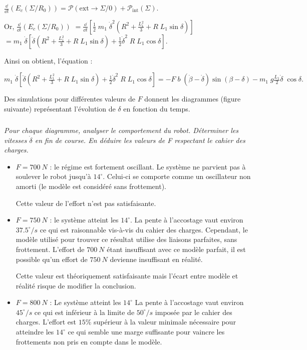 \begin{multicols}{2}
\begin{corrige}
$
\frac{\dd }{\dd t}(E_c(\Sigma/R_0))=\mathcal{P}(\text{ext}\rightarrow \Sigma/0)+\mathcal{P}_\text{int}( \Sigma).
$

Or, $
\frac{\dd }{\dd t}(E_c(\Sigma/R_0))$ 
$=\frac{\dd }{\dd t}\left[\frac{1}{2}\;m_1\;\dot{\delta}^2\left(R^2+\frac{L_1^2}{3}+R\;L_1\sin\delta\right)\right]$
$=m_1\;\dot{\delta}\left[\ddot{\delta}\left(R^2+\frac{L_1^2}{3}+R\;L_1\sin\delta\right)+\frac{1}{2}\dot{\delta}^2\;R\;L_1\cos\delta\right]$.


Ainsi on obtient, l'équation :


$
\boxed{
m_1\;\dot{\delta}\left[\ddot{\delta}\left(R^2+\frac{L_1^2}{3}+R\;L_1\sin\delta\right)+\frac{1}{2}\dot{\delta}^2\;R\;L_1\cos\delta\right]
=-F\;b\;\left(\dot{\beta}-\dot{\delta}\right)\sin(\beta-\delta)-m_1\;g\frac{L_1}{2}\dot{\delta}\;\cos\delta.
}
$

\end{corrige}
\else
\fi


Des simulations pour différentes valeurs de $F$ donnent les diagrammes (figure suivante) représentant l'évolution de $\delta$ en fonction du temps.

\subparagraph{}
\textit{Pour chaque diagramme, analyser le comportement du robot. Déterminer les vitesses $\dot{\delta}$ en fin de course. En déduire les valeurs de F respectant le cahier des charges.}
\ifprof
\begin{corrige}
\begin{itemize}
\item \textbf{$F=\SI{700}{N}$} : le régime est fortement oscillant. Le système ne parvient pas à soulever
le robot jusqu'à $14^{\circ}$. Celui-ci se comporte comme un oscillateur non
amorti (le modèle est considéré sans frottement).

Cette valeur de l'effort n'est pas satisfaisante.

\item \textbf{$F=\SI{750}{N}$} : le système atteint les $14^{\circ}$. La pente à l'accostage vaut environ $37.5^{\circ}/s$
ce qui est raisonnable vis-à-vis du cahier des charges. Cependant, le
modèle utilisé pour trouver ce résultat utilise des liaisons parfaites,
sans frottement. L'effort de $\SI{700}{N}$ étant insuffisant avec ce modèle
parfait, il est possible qu'un effort de $\SI{750}{N}$ devienne insuffisant en
réalité.

Cette valeur est théoriquement satisfaisante mais l'écart entre modèle
et réalité risque de modifier la conclusion.

\item \textbf{$F=\SI{800}{N}$} : Le système atteint les $14^{\circ}$ La pente à l'accostage vaut environ $45^{\circ}/s$ ce
qui est inférieur à la limite de $50^{\circ}/s$ imposée par le cahier des
charges. L'effort est $15\%$ supérieur à la valeur minimale nécessaire
pour atteindre les $14^{\circ}$ ce qui semble une marge suffisante pour vaincre
les frottements non pris en compte dans le modèle.


\end{itemize}
\end{corrige}
\end{multicols}
